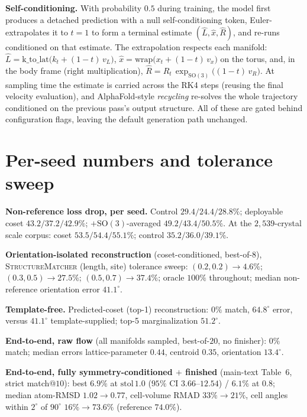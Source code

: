 \documentclass[journal=jcisd8,manuscript=suppinfo]{achemso}
\begin{document}
\textbf{Self-conditioning.} With probability $0.5$ during training, the model first
produces a detached prediction with a null self-conditioning token,
Euler-extrapolates it to $t{=}1$ to form a terminal estimate
$(\hat L,\hat x,\hat R)$, and re-runs conditioned on that estimate. The
extrapolation respects each manifold:
$\hat L=\mathrm{k\_to\_lat}\big(k_t+(1{-}t)\,v_L\big)$,
$\hat x=\mathrm{wrap}\big(x_t+(1{-}t)\,v_x\big)$ on the torus, and, in the body
frame (right multiplication),
$\hat R=R_t\,\exp_{\mathrm{SO}(3)}\!\big((1{-}t)\,v_R\big)$. At sampling time the
estimate is carried across the RK4 steps (reusing the final velocity evaluation),
and AlphaFold-style \emph{recycling} re-solves the whole trajectory conditioned on
the previous pass's output structure. All of these are gated behind configuration
flags, leaving the default generation path unchanged.

\section{Per-seed numbers and tolerance sweep}\label{sisec:numbers}
\textbf{Non-reference loss drop, per seed.} Control $29.4/24.4/28.8\%$; deployable
coset $43.2/37.2/42.9\%$; $+\mathrm{SO}(3)$-averaged $49.2/43.4/50.5\%$. At the
$2{,}539$-crystal scale corpus: coset $53.5/54.4/55.1\%$; control
$35.2/36.0/39.1\%$.

\textbf{Orientation-isolated reconstruction} (coset-conditioned, best-of-$8$),
\textsc{StructureMatcher} (length, site) tolerance sweep:
$(0.2,0.2)\!\to\!4.6\%$; $(0.3,0.5)\!\to\!27.5\%$; $(0.5,0.7)\!\to\!37.4\%$; oracle
$100\%$ throughout; median non-reference orientation error $41.1^\circ$.

\textbf{Template-free.} Predicted-coset (top-1) reconstruction: $0\%$ match,
$64.8^\circ$ error, versus $41.1^\circ$ template-supplied; top-5 marginalization
$51.2^\circ$.

\textbf{End-to-end, raw flow} (all manifolds sampled, best-of-$20$, no finisher):
$0\%$ match; median errors lattice-parameter $0.44$, centroid $0.35$, orientation
$13.4^\circ$.

\textbf{End-to-end, fully symmetry-conditioned $+$ finished} (main-text
Table~6, strict match@$10$): best $6.9\%$ at $\text{stol}\,1.0$ ($95\%$ CI
$3.66$--$12.54$) / $6.1\%$ at $0.8$; median atom-RMSD $1.02\!\to\!0.77$, cell-volume
RMAD $33\%\!\to\!21\%$, cell angles within $2^\circ$ of $90^\circ$
$16\%\!\to\!73.6\%$ (reference $74.0\%$).


\end{document}
